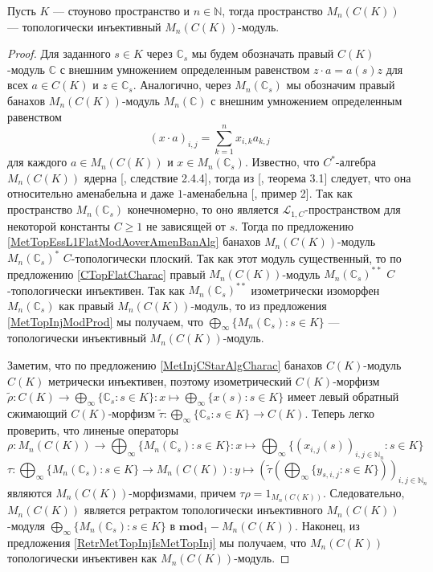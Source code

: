 \begin{proposition}\label{CKMatrixModTopInj} Пусть $K$ --- стоуново пространство и $n\in\mathbb{N}$, тогда пространство $M_n(C(K))$ --- топологически инъективный $M_n(C(K))$-модуль.
\end{proposition}
\begin{proof} Для заданного $s\in K$ через $\mathbb{C}_s$ мы будем обозначать правый $C(K)$-модуль $\mathbb{C}$ с внешним умножением определенным равенством $z\cdot a=a(s)z$ для всех $a\in C(K)$ и $z\in\mathbb{C}_s$. Аналогично, через $M_n(\mathbb{C}_s)$ мы обозначим правый банахов $M_n(C(K))$-модуль $M_n(\mathbb{C})$ с внешним умножением определенным равенством
$$
(x\cdot a)_{i,j}=\sum_{k=1}^n x_{i,k}a_{k,j}
$$
для каждого $a\in M_n(C(K))$ и $x\in M_n(\mathbb{C}_s)$. Известно, что $C^*$-алгебра $M_n(C(K))$ ядерна [\cite{BroOzaCStarAlgFinDimApprox}, следствие 2.4.4], тогда из [\cite{HaaNucCStarAlgAmen}, теорема 3.1] следует, что она относительно аменабельна и даже $1$-аменабельна [\cite{RundeAmenConstFour}, пример 2]. Так как пространство $M_n(\mathbb{C}_s)$ конечномерно, то оно является $\mathscr{L}_{1,C}$-пространством для некоторой константы $C\geq 1$ не зависящей от $s$. Тогда по предложению \ref{MetTopEssL1FlatModAoverAmenBanAlg} банахов $M_n(C(K))$-модуль $M_n(\mathbb{C}_s)^*$ $C$-топологически плоский. Так как этот модуль существенный, то по предложению \ref{CTopFlatCharac} правый $M_n(C(K))$-модуль $M_n(\mathbb{C}_s)^{**}$ $C$-топологически инъективен. Так как $M_n(\mathbb{C}_s)^{**}$ изометрически изоморфен $M_n(\mathbb{C}_s)$ как правый $M_n(C(K))$-модуль, то из предложения \ref{MetTopInjModProd} мы получаем, что $\bigoplus_\infty\{M_n(\mathbb{C}_s):s\in K\}$ --- топологически инъективный $M_n(C(K))$-модуль.

Заметим, что по предложению \ref{MetInjCStarAlgCharac} банахов $C(K)$-модуль $C(K)$ метрически инъективен, поэтому изометрический $C(K)$-морфизм $\widetilde{\rho}:C(K)\to\bigoplus_\infty\{ \mathbb{C}_s:s\in K\}:x\mapsto \bigoplus_\infty\{x(s):s\in K\}$ имеет левый обратный сжимающий $C(K)$-морфизм $\widetilde{\tau}:\bigoplus_\infty\{ \mathbb{C}_s:s\in K\} \to C(K)$. Теперь легко проверить, что линеные операторы
$$
\rho:M_n(C(K))\to\bigoplus\nolimits_\infty\{M_n(\mathbb{C}_s):s\in K\}:x\mapsto \bigoplus\nolimits_\infty\{(x_{i,j}(s))_{i,j\in\mathbb{N}_n}:s\in K\}
$$
$$
\tau:\bigoplus\nolimits_\infty\{M_n(\mathbb{C}_s):s\in K\}\to M_n(C(K)):y\mapsto \left(\widetilde{\tau}\left(\bigoplus\nolimits_\infty\{y_{s,i,j}:s\in K\}\right)\right)_{i,j\in\mathbb{N}_n}
$$
являются $M_n(C(K))$-морфизмами, причем $\tau \rho=1_{M_n(C(K))}$. Следовательно, $M_n(C(K))$ является ретрактом топологически инъективного $M_n(C(K))$-модуля $\bigoplus_\infty\{M_n(\mathbb{C}_s):s\in K\}$ в $\mathbf{mod}_1-M_n(C(K))$. Наконец, из предложения \ref{RetrMetTopInjIsMetTopInj} мы получаем, что $M_n(C(K))$ топологически инъективен как $M_n(C(K))$-модуль.
\end{proof}

